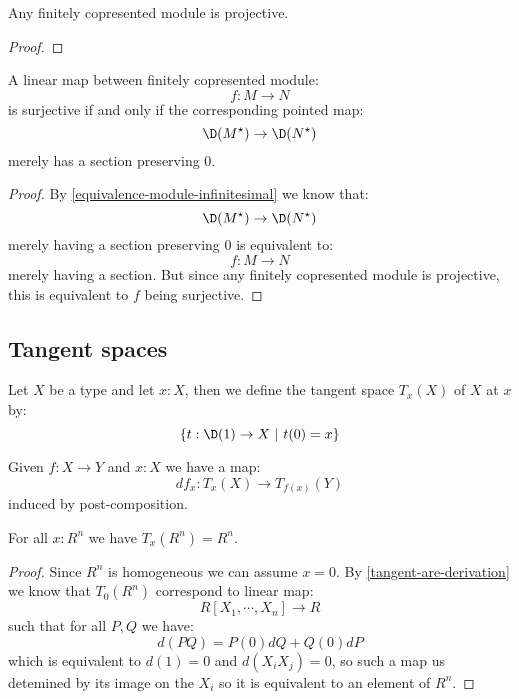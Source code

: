 \begin{lemma}
Any finitely copresented module is projective.
\end{lemma}

\begin{proof}
\end{proof}

\begin{lemma}\label{neighborhood-tangent-correspondence-smooth}
A linear map between finitely copresented module:
\[f:M\to N\]
is surjective if and only if the corresponding pointed map:
\[\D(M^\star) \to \D(N^\star)\]
merely has a section preserving $0$.
\end{lemma}

\begin{proof}
By \cref{equivalence-module-infinitesimal} we know that:
\[\D(M^\star) \to \D(N^\star)\]
merely having a section preserving $0$ is equivalent to:
\[f:M\to N\]
merely having a section. But since any finitely copresented module is projective, this is equivalent to $f$ being surjective.
\end{proof}


\subsection{Tangent spaces}

\begin{definition}
Let $X$ be a type and let $x:X$, then we define the tangent space $T_x(X)$ of $X$ at $x$ by:
\[\{t:\D(1)\to X\ |\ t(0)=x\}\]
\end{definition}

\begin{definition}
Given $f:X\to Y$ and $x:X$ we have a map:
\[df_x : T_x(X)\to T_{f(x)}(Y)\]
induced by post-composition.
\end{definition}

\begin{lemma}\label{An-dimension-n}
For all $x:R^n$ we have $T_x(R^n) = R^n$.
\end{lemma}

\begin{proof}
Since $R^n$ is homogeneous we can assume $x=0$. By \cref{tangent-are-derivation} we know that $T_0(R^n)$ correspond to linear map:
\[R[X_1,\cdots,X_n] \to R\]
such that for all $P,Q$ we have:
\[d(PQ) = P(0)dQ + Q(0)dP\]
which is equivalent to $d(1) = 0$ and $d(X_iX_j) = 0$, so such a map us detemined by its image on the $X_i$ so it is equivalent to an element of $R^n$.
\end{proof}

